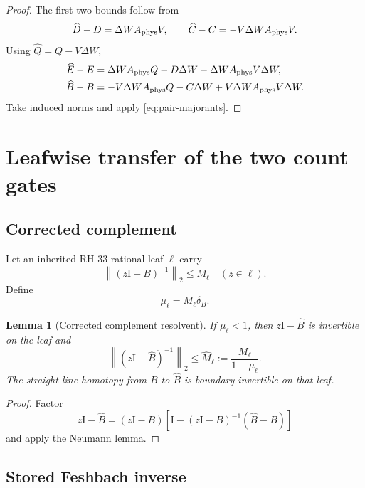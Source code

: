 \documentclass[11pt]{article}
\newtheorem{lemma}[theorem]{Lemma}
\theoremstyle{definition}
\theoremstyle{remark}
\newcommand{\Id}{\mathrm I}
\newcommand{\norm}[1]{\left\lVert#1\right\rVert}
\newcommand{\Aphys}{A_{\rm phys}}
\begin{document}
\begin{proof}
The first two bounds follow from
\[
 \widehat D-D=\Delta W\Aphys V,\qquad
 \widehat C-C=-V\Delta W\Aphys V.
\]
Using \(\widehat Q=Q-V\Delta W\),
\begin{align*}
 \widehat E-E
 &=\Delta W\Aphys Q
   -D\Delta W
   -\Delta W\Aphys V\Delta W,\\
 \widehat B-B
 &=-V\Delta W\Aphys Q
   -C\Delta W
   +V\Delta W\Aphys V\Delta W.
\end{align*}
Take induced norms and apply \cref{eq:pair-majorants}.
\end{proof}

\section{Leafwise transfer of the two count gates}
\label{sec:leaf-transfer}

\subsection{Corrected complement}

Let an inherited RH-33 rational leaf \(\ell\) carry
\begin{equation}
 \norm{(z\Id-B)^{-1}}_2\leq M_\ell
 \quad(z\in\ell).
 \label{eq:stored-resolvent}
\end{equation}
Define
\begin{equation}
 \mu_\ell=M_\ell\delta_B.
 \label{eq:complement-product}
\end{equation}

\begin{lemma}[Corrected complement resolvent]
\label{lem:corrected-complement}
If \(\mu_\ell<1\), then \(z\Id-\widehat B\) is invertible on the leaf and
\begin{equation}
 \norm{(z\Id-\widehat B)^{-1}}_2
 \leq
 \widehat M_\ell:=
 \frac{M_\ell}{1-\mu_\ell}.
 \label{eq:corrected-resolvent}
\end{equation}
The straight-line homotopy from \(B\) to \(\widehat B\) is boundary
invertible on that leaf.
\end{lemma}

\begin{proof}
Factor
\[
 z\Id-\widehat B
 =(z\Id-B)
 \left[\Id-(z\Id-B)^{-1}(\widehat B-B)\right]
\]
and apply the Neumann lemma.
\end{proof}

\subsection{Stored Feshbach inverse}
\end{document}
